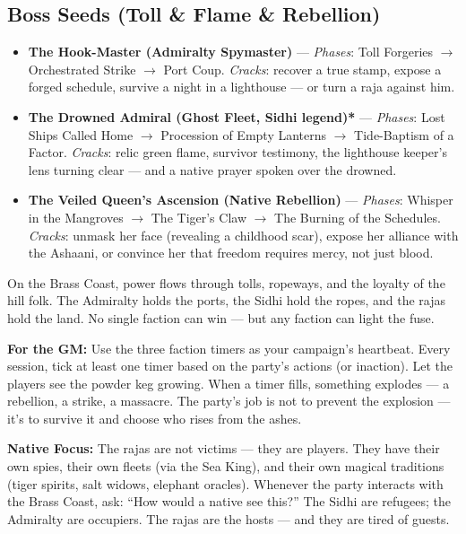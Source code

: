 \subsection*{Boss Seeds (Toll \& Flame \& Rebellion)}
\begin{itemize}
\item \textbf{The Hook-Master (Admiralty Spymaster)\textdaggerdbl} --- \emph{Phases}: Toll Forgeries \(\rightarrow\) Orchestrated Strike \(\rightarrow\) Port Coup. \emph{Cracks}: recover a true stamp, expose a forged schedule, survive a night in a lighthouse --- or turn a raja against him.
\item \textbf{The Drowned Admiral (Ghost Fleet, Sidhi legend)*} --- \emph{Phases}: Lost Ships Called Home \(\rightarrow\) Procession of Empty Lanterns \(\rightarrow\) Tide-Baptism of a Factor. \emph{Cracks}: relic green flame, survivor testimony, the lighthouse keeper's lens turning clear --- and a native prayer spoken over the drowned.
\item \textbf{The Veiled Queen's Ascension (Native Rebellion)\textdagger} --- \emph{Phases}: Whisper in the Mangroves \(\rightarrow\) The Tiger's Claw \(\rightarrow\) The Burning of the Schedules. \emph{Cracks}: unmask her face (revealing a childhood scar), expose her alliance with the Ashaani, or convince her that freedom requires mercy, not just blood.
\end{itemize}

\begin{tcolorbox}[colback=black!3,colframe=black!40!white,title={Patronage \& Power},breakable]
On the Brass Coast, power flows through tolls, ropeways, and the loyalty of the hill folk. The Admiralty holds the ports, the Sidhi hold the ropes, and the rajas hold the land. No single faction can win --- but any faction can light the fuse.

\textbf{For the GM:}  
Use the three faction timers as your campaign's heartbeat. Every session, tick at least one timer based on the party's actions (or inaction). Let the players see the powder keg growing. When a timer fills, something explodes --- a rebellion, a strike, a massacre. The party's job is not to prevent the explosion --- it's to survive it and choose who rises from the ashes.

\noindent
\textbf{Native Focus:}  
The rajas are not victims --- they are players. They have their own spies, their own fleets (via the Sea King), and their own magical traditions (tiger spirits, salt widows, elephant oracles). Whenever the party interacts with the Brass Coast, ask: ``How would a native see this?'' The Sidhi are refugees; the Admiralty are occupiers. The rajas are the hosts --- and they are tired of guests.
\end{tcolorbox}

